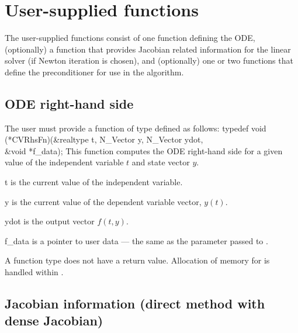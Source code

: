 \section{User-supplied functions}\label{ss:user_fct_sim}

The user-supplied functions consist of one function defining the ODE, 
(optionally) a function that provides Jacobian related information for the linear
solver (if Newton iteration is chosen), and (optionally) one or two functions 
that define the preconditioner for use in the {\spgmr} algorithm. 

\subsection{ODE right-hand side} \label{ss:rhsFn}

The user must provide a function of type  defined as follows:
{
  typedef void (*CVRhsFn)(&realtype t, N\_Vector y, N\_Vector ydot, \\
                          &void *f\_data);
}
{
  This function computes the ODE right-hand side for a given value
  of the independent variable $t$ and state vector $y$.
}
{
  \begin{args}[f\_data]
  \item[t]
    is the current value of the independent variable.
  \item[y]
    is the current value of the dependent variable vector, $y(t)$.
  \item[ydot]
    is the output vector $f(t,y)$.
  \item[f\_data]
    is a pointer to user data --- the same as the       
    parameter passed to .   
  \end{args}
}
{
  A  function type does not have a return value.
}
{
Allocation of memory for  is handled within {\cvode}.
}


\subsection{Jacobian information (direct method with dense Jacobian)}
\label{ss:djacFn}

